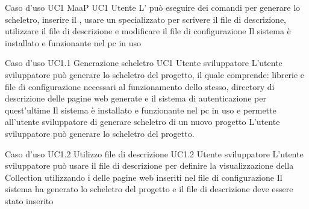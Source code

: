 \UCtitle
{Caso d'uso UC1}
{MaaP}
\UC
{UC1}
{Utente }
{L' può eseguire dei comandi per generare lo scheletro, inserire il , usare un  specializzato per scrivere il file di descrizione, utilizzare il file di descrizione e modificare il file di configurazione}
{Il sistema è installato e funzionante nel pc in uso}

\UCtitle
{Caso d'uso UC1.1}
{Generazione scheletro}
\UC
{UC1}
{Utente sviluppatore}
{L'utente sviluppatore può generare lo scheletro del progetto, il quale comprende: librerie e file di configurazione necessari al funzionamento dello stesso, directory di descrizione delle pagine web generate e il sistema di autenticazione per quest'ultime}
{Il sistema è installato e funzionante nel pc in uso e permette all'utente sviluppatore di generare scheletro di un nuovo progetto}
\scenario
{L'utente sviluppatore può generare lo scheletro del progetto.}



\UCtitle
{Caso d'uso UC1.2}
{Utilizzo file di descrizione}
\UC
{UC1.2}
{Utente sviluppatore}
{L'utente sviluppatore  può usare il file di descrizione per definire la visualizzazione della Collection utilizzando i  delle pagine web inseriti nel file di configurazione}
{Il sistema ha generato lo scheletro del progetto e il file di descrizione deve essere stato inserito}

